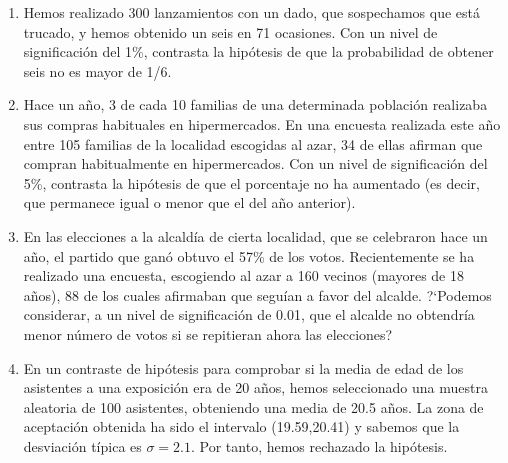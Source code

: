 \begin{adjustwidth}{20pt}{10pt}
\begin{enumerate}[PB. 1. ]
\hspace{-15mm}\vspace{1cm}

\item Hemos realizado 300 lanzamientos con un dado, que sospechamos que está trucado, y hemos obtenido un seis en 71 ocasiones. Con un nivel de significación del 1\%, contrasta la hipótesis de que la probabilidad de obtener seis no es mayor de 1/6. 

\hspace{-15mm}\vspace{1cm}

\item Hace un año, 3 de cada 10 familias de una determinada población realizaba sus compras habituales en hipermercados. En una encuesta realizada este año entre 105 familias de la localidad escogidas al azar, 34 de ellas afirman que compran habitualmente en hipermercados. Con un nivel de significación del 5\%, contrasta la hipótesis de que el porcentaje no ha aumentado (es decir, que permanece igual o menor que el del año anterior). 

\hspace{-15mm}\vspace{1cm}

\item En las elecciones a la alcaldía de cierta localidad, que se celebraron hace un año, el partido que ganó obtuvo el 57\% de los votos. Recientemente se ha realizado una encuesta, escogiendo al azar a 160 vecinos (mayores de 18 años), 88 de los cuales afirmaban que seguían a favor del alcalde. ?`Podemos considerar, a un nivel de significación de 0.01, que el alcalde no obtendría menor número de votos si se repitieran ahora las elecciones? 

\hspace{-15mm}\vspace{1cm}


\item En un contraste de hipótesis para comprobar si la media de edad de los asistentes a una exposición era de 20 años, hemos seleccionado una muestra aleatoria de 100 asistentes, obteniendo una media de 20.5 años. La zona de aceptación obtenida ha sido el intervalo (19.59,20.41) y sabemos que la desviación típica es $\sigma=2.1$. Por tanto, hemos rechazado la hipótesis. 


\end{enumerate}
\end{adjustwidth}
